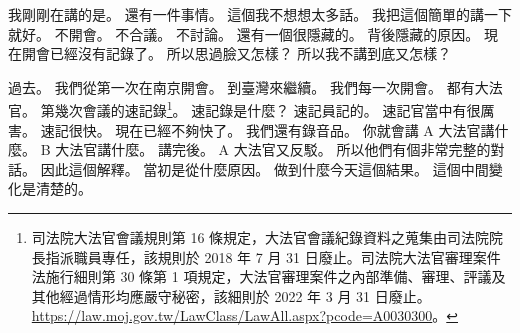 \hypertarget{w01:cue:1733}{}我剛剛在講的是。
\hypertarget{w01:cue:1734}{}還有一件事情。
\hypertarget{w01:cue:1735}{}這個我不想想太多話。
\hypertarget{w01:cue:1736}{}我把這個簡單的講一下就好。
\hypertarget{w01:cue:1737}{}不開會。
\hypertarget{w01:cue:1738}{}不合議。
\hypertarget{w01:cue:1739}{}不討論。
\hypertarget{w01:cue:1740}{}還有一個很隱藏的。
\hypertarget{w01:cue:1741}{}背後隱藏的原因。
\hypertarget{w01:cue:1742}{}現在開會已經沒有記錄了。
\hypertarget{w01:cue:1743}{}所以思過臉又怎樣？
\hypertarget{w01:cue:1744}{}所以我不講到底又怎樣？

\hypertarget{w01:cue:1745}{}過去。
\hypertarget{w01:cue:1746}{}我們從第一次在南京開會。
\hypertarget{w01:cue:1747}{}到臺灣來繼續。
\hypertarget{w01:cue:1748}{}我們每一次開會。
\hypertarget{w01:cue:1749}{}都有大法官。
\hypertarget{w01:cue:1750}{}第幾次會議的速記錄\footnote{司法院大法官會議規則第 16 條規定，大法官會議紀錄資料之蒐集由司法院院長指派職員專任，該規則於 2018 年 7 月 31 日廢止。司法院大法官審理案件法施行細則第 30 條第 1 項規定，大法官審理案件之內部準備、審理、評議及其他經過情形均應嚴守秘密，該細則於 2022 年 3 月 31 日廢止。\url{https://law.moj.gov.tw/LawClass/LawAll.aspx?pcode=A0030300}。}。
\hypertarget{w01:cue:1751}{}速記錄是什麼？
\hypertarget{w01:cue:1752}{}速記員記的。
\hypertarget{w01:cue:1753}{}速記官當中有很厲害。
\hypertarget{w01:cue:1754}{}速記很快。
\hypertarget{w01:cue:1755}{}現在已經不夠快了。
\hypertarget{w01:cue:1756}{}我們還有錄音品。
\hypertarget{w01:cue:1757}{}你就會講 A 大法官講什麼。
\hypertarget{w01:cue:1758}{}B 大法官講什麼。
\hypertarget{w01:cue:1759}{}講完後。
\hypertarget{w01:cue:1760}{}A 大法官又反駁。
\hypertarget{w01:cue:1761}{}所以他們有個非常完整的對話。
\hypertarget{w01:cue:1762}{}因此這個解釋。
\hypertarget{w01:cue:1763}{}當初是從什麼原因。
\hypertarget{w01:cue:1764}{}做到什麼今天這個結果。
\hypertarget{w01:cue:1765}{}這個中間變化是清楚的。

